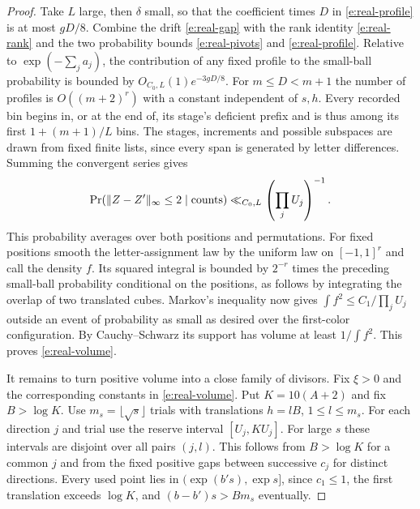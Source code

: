 \documentclass[11pt]{article}
\numberwithin{equation}{section}
\begin{document}
\begin{proof}
Take $L$ large, then $\delta$ small, so that the coefficient times
$D$ in \eqref{e:real-profile} is at most $gD/8$. Combine the drift
\eqref{e:real-gap} with the rank identity \eqref{e:real-rank} and the
two probability bounds \eqref{e:real-pivots} and \eqref{e:real-profile}. Relative to
$\exp(-\sum_j a_j)$, the contribution of any fixed profile
to the small-ball probability is bounded by
$O_{C_0,L}(1)e^{-3gD/8}$.
For $m\le D<m+1$ the number of profiles is $O((m+2)^r)$ with a
constant independent of $s,h$. Every recorded bin begins in, or at
the end of, its stage's deficient prefix and is thus among its first
$1+(m+1)/L$ bins. The stages, increments and possible subspaces are
drawn from fixed finite lists, since every span is generated by
letter differences. Summing the convergent series gives
\[
 \Pr(\|Z-Z'\|_\infty\le2\mid\hbox{counts})
        \ll_{C_0,L} \left(\prod_j U_j\right)^{-1}.
\]
This probability averages over both positions and permutations.
For fixed positions smooth the letter-assignment law by the uniform
law on $[-1,1]^r$ and call the density $f$. Its squared integral
is bounded by $2^{-r}$ times the preceding small-ball probability
conditional on the positions, as follows by integrating the overlap
of two translated cubes. Markov's inequality now gives
$\int f^2\le C_1/\prod_j U_j$ outside an event of probability as
small as desired over the first-color configuration. By
Cauchy--Schwarz its support has volume at least $1/\int f^2$.
This proves \eqref{e:real-volume}.

It remains to turn positive volume into a close family of divisors.
Fix $\xi>0$ and the corresponding
constants in \eqref{e:real-volume}.
Put $K=10(A+2)$ and fix $B>\log K$. Use $m_s=\lfloor\sqrt{s}\rfloor$
trials with translations $h=lB$, $1\le l\le m_s$. For each direction
$j$ and trial use the reserve interval $[U_j,KU_j]$. For large $s$
these intervals are disjoint over all pairs $(j,l)$. This follows
from $B>\log K$ for a common $j$ and from the fixed positive gaps
between successive $c_j$ for distinct directions. Every used point
lies in $(\exp(b's),\exp s]$, since $c_1\le1$, the first translation
exceeds $\log K$, and $(b-b')s>Bm_s$ eventually.


\end{proof}
\end{document}
